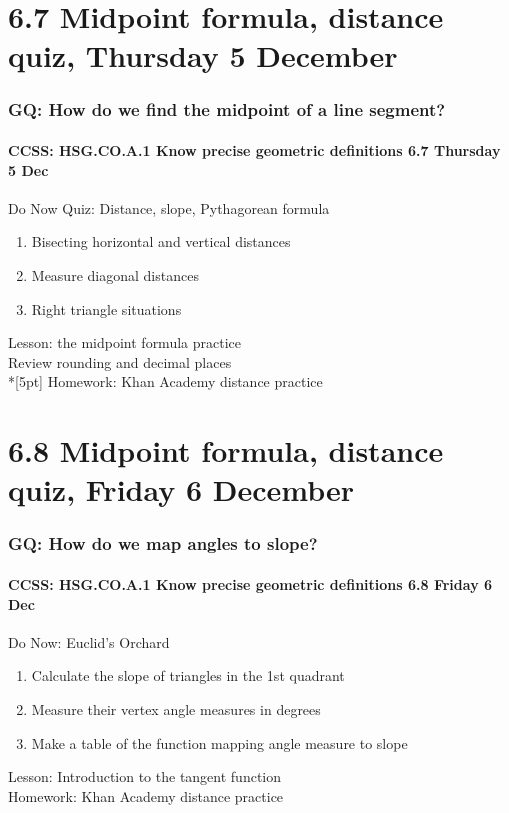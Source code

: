 \documentclass{beamer}
\begin{document}
  \section{6.7 Midpoint formula, distance quiz, Thursday 5 December}
  \frame
  {
    \frametitle{GQ: How do we find the midpoint of a line segment?}
    \framesubtitle{CCSS: HSG.CO.A.1 Know precise geometric definitions \hfill \alert{6.7 Thursday 5 Dec}}

    \begin{block}{Do Now Quiz: Distance, slope, Pythagorean formula}
    \begin{enumerate}
      \item Bisecting horizontal and vertical distances
      \item Measure diagonal distances
      \item Right triangle situations
    \end{enumerate}
    \end{block}
    Lesson: the midpoint formula practice\\
    Review rounding and decimal places \\*[5pt]
    Homework: Khan Academy distance practice
  }

  \section{6.8 Midpoint formula, distance quiz, Friday 6 December}
  \frame
  {
    \frametitle{GQ: How do we map angles to slope?}
    \framesubtitle{CCSS: HSG.CO.A.1 Know precise geometric definitions \hfill \alert{6.8 Friday 6 Dec}}

    \begin{block}{Do Now: Euclid's Orchard}
    \begin{enumerate}
      \item Calculate the slope of triangles in the 1st quadrant
      \item Measure their vertex angle measures in degrees
      \item Make a table of the function mapping angle measure to slope
    \end{enumerate}
    \end{block}
    Lesson: Introduction to the tangent function \\
    Homework: Khan Academy distance practice
  }
\end{document}
